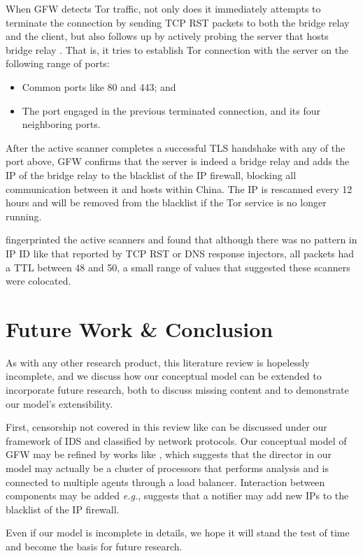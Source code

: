 \documentclass[sigconf, screen, balance=false]{acmart}
\begin{document}
When GFW detects Tor traffic, not only does it immediately attempts to terminate the connection by sending TCP RST packets to both the bridge relay and the client, but also follows up by actively probing the server that hosts bridge relay \cite{dunna2018analyzing}. That is, it tries to establish Tor connection with the server on the following range of ports:
\begin{itemize}
    \item Common ports like 80 and 443; and
    \item The port engaged in the previous terminated connection, and its four neighboring ports.
\end{itemize}
After the active scanner completes a successful TLS handshake with any of the port above, GFW confirms that the server is indeed a bridge relay and adds the IP of the bridge relay to the blacklist of the IP firewall, blocking all communication between it and hosts within China. The IP is rescanned every 12 hours and will be removed from the blacklist if the Tor service is no longer running.

\citeauthor{dunna2018analyzing} fingerprinted the active scanners and found that although there was no pattern in IP ID like that reported by TCP RST or DNS response injectors, all packets had a TTL between 48 and 50, a small range of values that suggested these scanners were colocated.

\section{Future Work \& Conclusion}

As with any other research product, this literature review is hopelessly incomplete, and we discuss how our conceptual model can be extended to incorporate future research, both to discuss missing content and to demonstrate our model's extensibility.

First, censorship not covered in this review like \cite{ensafi2015examining} can be discussed under our framework of IDS and classified by network protocols. Our conceptual model of GFW may be refined by works like \cite{anonymous2014towards}, which suggests that the director in our model may actually be a cluster of processors that performs analysis and is connected to multiple agents through a load balancer. Interaction between components may be added \textit{e.g.}, \citeauthor{dunna2018analyzing} suggests that a notifier may add new IPs to the blacklist of the IP firewall.

Even if our model is incomplete in details, we hope it will stand the test of time and become the basis for future research.


\end{document}
